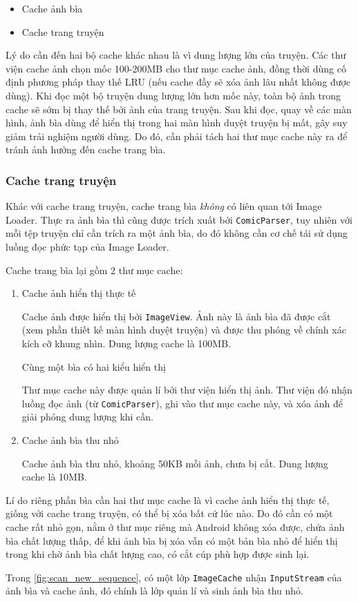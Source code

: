 \documentclass[../../../../thesis]{subfiles}
\begin{document}
\begin{itemize}
    \item
        Cache ảnh bìa
    \item
        Cache trang truyện
\end{itemize}

Lý do cần đến hai bộ cache khác nhau là vì dung lượng lớn của truyện. Các thư
viện cache ảnh chọn mốc 100-200MB cho thư mục cache ảnh, đồng thời dùng cố định
phương pháp thay thế LRU (nếu cache đầy sẽ xóa ảnh lâu nhất không được dùng).
Khi đọc một bộ truyện dung lượng lớn hơn mốc này, toàn bộ ảnh trong cache sẽ sớm
bị thay thế bởi ảnh của trang truyện. Sau khi đọc, quay về các màn hình, ảnh bìa
dùng để hiển thị trong hai màn hình duyệt truyện bị mất, gây suy giảm trải
nghiệm người dùng. Do đó, cần phải tách hai thư mục cache này ra để tránh ảnh
hưởng đến cache trang bìa.

\subsubsection{Cache trang truyện}

Khác với cache trang truyện, cache trang bìa \emph{không} có liên quan tới Image
Loader. Thực ra ảnh bìa thì cũng được trích xuất bởi \texttt{ComicParser}, tuy
nhiên với mỗi tệp truyện chỉ cần trích ra một ảnh bìa, do đó không cần cơ chế
tái sử dụng luồng đọc phức tạp của Image Loader.

Cache trang bìa lại gồm 2 thư mục cache:

\begin{enumerate}
    \item
        Cache ảnh hiển thị thực tế

        Cache ảnh được hiển thị bởi \texttt{ImageView}. Ảnh này là ảnh bìa đã
        được cắt (xem phần thiết kế màn hình duyệt truyện) và được thu phóng về
        chính xác kích cỡ khung nhìn. Dung lượng cache là 100MB.

        Cùng một bìa có hai kiểu hiển thị

        Thư mục cache này được quản lí bởi thư viện hiển thị ảnh. Thư viện đó
        nhận luồng đọc ảnh (từ \texttt{ComicParser}), ghi vào thư mục cache này,
        và xóa ảnh để giải phóng dung lượng khi cần.
    \item
        Cache ảnh bìa thu nhỏ

        Cache ảnh bìa thu nhỏ, khoảng 50KB mỗi ảnh, chưa bị cắt. Dung lượng
        cache là 10MB.
\end{enumerate}

Lí do riêng phần bìa cần hai thư mục cache là vì cache ảnh hiển thị thực tế,
giống với cache trang truyện, có thể bị xóa bất cứ lúc nào. Do đó cần có một
cache rất nhỏ gọn, nằm ở thư mục riêng mà Android không xóa được, chứa ảnh bìa
chất lượng thấp, để khi ảnh bìa bị xóa vẫn có một bản bìa nhỏ để hiển thị trong
khi chờ ảnh bìa chất lượng cao, có cắt cúp phù hợp được sinh lại.

Trong \autoref{fig:scan_new_sequence}, có một lớp \texttt{ImageCache} nhận
\texttt{InputStream} của ảnh bìa và cache ảnh, đó chính là lớp quản lí và sinh
ảnh bìa thu nhỏ.
\end{document}
